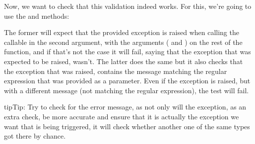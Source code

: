 \documentclass[a4paper,10pt,english]{sphinxmanual}
\begin{document}
Now, we want to check that this validation indeed works. For this, we’re going to use
the  and  methods:

\begin{sphinxVerbatim}[commandchars=\\\{\}]
 
      

 
     
                            
\end{sphinxVerbatim}

The former will expect that the provided exception is raised when calling the callable in the
second argument, with the arguments ( and ) on the rest of the function,
and if that’s not the case it will fail, saying that the exception that was expected to be raised,
wasn’t. The latter does the same but it also checks that the exception that was raised,
contains the message matching the regular expression that was provided as a parameter.
Even if the exception is raised, but with a different message (not matching the regular
expression), the test will fail.

\begin{sphinxadmonition}{tip}{Tip:}
Try to check for the error message, as not only will the exception, as an
extra check, be more accurate and ensure that it is actually the exception
we want that is being triggered, it will check whether another one of the
same types got there by chance.
\end{sphinxadmonition}
\end{document}
